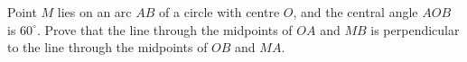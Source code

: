 Point $M$ lies on an arc $AB$ of a circle with centre $O$, and the central angle $AOB$ is $60^\circ$. Prove that the line through the midpoints of $OA$ and $MB$ is perpendicular to the line through the midpoints of $OB$ and $MA$.
